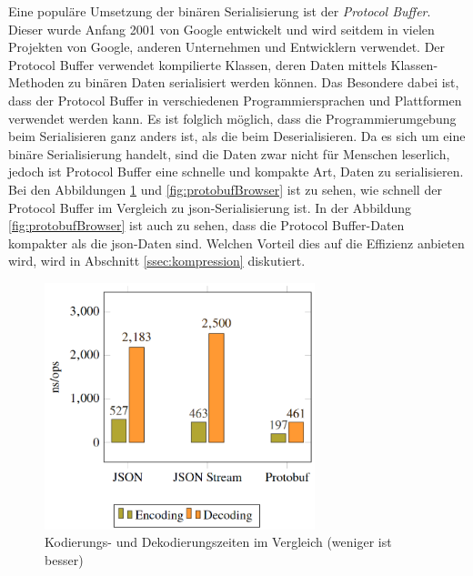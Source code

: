Eine populäre Umsetzung der binären Serialisierung ist der \textit{Protocol Buffer}. Dieser wurde Anfang 2001 von Google entwickelt und wird seitdem in vielen Projekten von Google, anderen Unternehmen und Entwicklern verwendet. Der Protocol Buffer verwendet kompilierte Klassen, deren Daten mittels Klassen-Methoden zu binären Daten serialisiert werden können. Das Besondere dabei ist, dass der Protocol Buffer in verschiedenen Programmiersprachen und Plattformen verwendet werden kann. Es ist folglich möglich, dass die Programmierumgebung beim Serialisieren ganz anders ist, als die beim Deserialisieren. Da es sich um eine binäre Serialisierung handelt, sind die Daten zwar nicht für Menschen leserlich, jedoch ist Protocol Buffer eine schnelle und kompakte Art, Daten zu serialisieren. Bei den Abbildungen \ref{fig:protobufTime} und \ref{fig:protobufBrowser} ist zu sehen, wie schnell der Protocol Buffer im Vergleich zu \ac{json}-Serialisierung ist.  In der Abbildung \ref{fig:protobufBrowser} ist auch zu sehen, dass die Protocol Buffer-Daten kompakter als die \ac{json}-Daten sind. Welchen Vorteil dies auf die Effizienz anbieten wird, wird in Abschnitt \ref{ssec:kompression} diskutiert.\cite{currier2022protocol}

\begin{figure}[htp]
    \centering
    \includegraphics[width=0.7\textwidth]{images/protobuf_time.png}
    \caption{Kodierungs- und Dekodierungszeiten im Vergleich (weniger ist besser)\cite{currier2022protocol}}
    \label{fig:protobufTime}
\end{figure}

